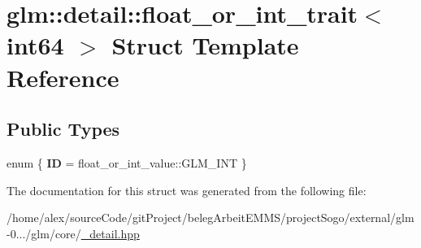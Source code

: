 \hypertarget{structglm_1_1detail_1_1float__or__int__trait_3_01int64_01_4}{\section{glm\-:\-:detail\-:\-:float\-\_\-or\-\_\-int\-\_\-trait$<$ int64 $>$ Struct Template Reference}
\label{structglm_1_1detail_1_1float__or__int__trait_3_01int64_01_4}
}
\subsection*{Public Types}
\begin{DoxyCompactItemize}
\item 
enum \{ {\bfseries I\-D} = float\-\_\-or\-\_\-int\-\_\-value\-:\-:G\-L\-M\-\_\-\-I\-N\-T
 \}
\end{DoxyCompactItemize}


The documentation for this struct was generated from the following file\-:\begin{DoxyCompactItemize}
\item 
/home/alex/source\-Code/git\-Project/beleg\-Arbeit\-E\-M\-M\-S/project\-Sogo/external/glm-\/0.../glm/core/\hyperlink{__detail_8hpp}{\-\_\-detail.\-hpp}\end{DoxyCompactItemize}
